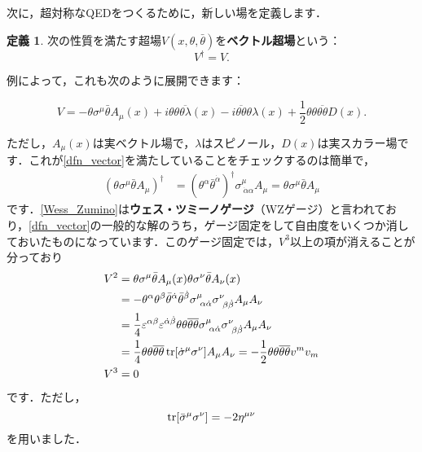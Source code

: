 \documentclass[a4paper,uplatex,dvipdfmx]{jsarticle}
\theoremstyle{definition}
\newtheorem{dfn}{定義}
\begin{document}
次に，超対称なQEDをつくるために，新しい場を定義します．

\begin{dfn}
  次の性質を満たす超場$V(x,\theta,\bar{\theta})$を\textbf{ベクトル超場}という：
  \begin{equation}
    V^{\dag}
    =
    V
    .
    \label{dfn_vector}
  \end{equation}
\end{dfn}

例によって，これも次のように展開できます：

\begin{equation}
  V
  =
  -
  \theta\sigma^{\mu}\bar{\theta}A_{\mu}(x)
  +
  i\theta\theta\overline{\theta\lambda}(x)
  -
  i\overline{\theta\theta}\theta\lambda(x)
  +
  \frac{1}{2}\theta\theta\overline{\theta\theta}D(x)
  .
  \label{Wess_Zumino}
\end{equation}

ただし，$A_{\mu}(x)$は実ベクトル場で，$\lambda$はスピノール，$D(x)$は実スカラー場です．これが\eqref{dfn_vector}を満たしていることをチェックするのは簡単で，
\begin{align}
  (\theta\sigma^{\mu}\bar{\theta}A_{\mu})^{\dag}
  &=
  (\theta^{\alpha}
  \bar{\theta}^{\dot{\alpha}})^{\dag}
  \sigma^{\mu}_{\ \dot{\alpha}\alpha}
  A_{\mu}
  =
  \theta\sigma^{\mu}\bar{\theta}A_{\mu}
\end{align}
です．\eqref{Wess_Zumino}は\textbf{ウェス・ツミーノゲージ}（WZゲージ）と言われており，\eqref{dfn_vector}の一般的な解のうち，ゲージ固定をして自由度をいくつか消しておいたものになっています．このゲージ固定では，$V^3$以上の項が消えることが分っており
\begin{align}
  V^2
  &=
  \theta\sigma^{\mu}\bar{\theta}A_{\mu}(x)
  \theta\sigma^{\nu}\bar{\theta}A_{\nu}(x)
  \nonumber
  \\
  &=
  -\theta^{\alpha}\theta^{\beta}\bar{\theta}^{\dot{\alpha}}\bar{\theta}^{\dot{\beta}}
  \sigma^{\mu}_{\ \alpha\dot{\alpha}}\sigma^{\nu}_{\ \beta\dot{\beta}}A_{\mu}A_{\nu}
  \nonumber
  \\
  &=
  \frac{1}{4}
  \varepsilon^{\alpha\beta}\varepsilon^{\dot{\alpha}\dot{\beta}}\theta\theta\overline{\theta\theta}
  \sigma^{\mu}_{\ \alpha\dot{\alpha}}\sigma^{\nu}_{\ \beta\dot{\beta}}A_{\mu}A_{\nu}
  \nonumber
  \\
  &=
  \frac{1}{4}\theta\theta\overline{\theta\theta}\tr[\dot{\sigma}^{\mu}\sigma^{\nu}]A_{\mu}A_{\nu}
  =
  -\frac{1}{2}\theta\theta\overline{\theta\theta}v^{m}v_{m}
  \\
  V^3
  &=
  0
\end{align}
です．ただし，
\begin{equation}
  \tr[\bar{\sigma}^{\mu}\sigma^{\nu}]
  =
  -2\eta^{\mu\nu}
\end{equation}
を用いました．
\end{document}

